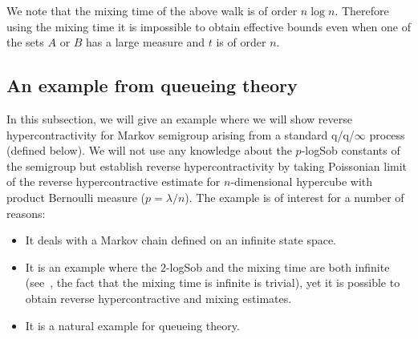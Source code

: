 \documentclass[11pt]{amsart}
\newcommand{\1}{\mathbf{1}}
\theoremstyle{definition}
\theoremstyle{plain}
\theoremstyle{remark}
\numberwithin{equation}{section}
\begin{document}
We note that the mixing time of the above walk is of order $n \log n$. Therefore using the mixing time it is impossible to obtain effective bounds even when one of the sets $A$ or $B$ has a large measure and
$t$ is of order $n$. 

\subsection{An example from queueing theory} \label{subsec:queue} 
In this subsection, we will give an example where we will show reverse hypercontractivity for Markov semigroup arising from a standard q/q/$\infty$ process (defined below).  We will not use  any knowledge about the $p$-logSob constants of the semigroup but establish reverse hypercontractivity by taking Poissonian limit of the reverse hypercontractive estimate for $n$-dimensional hypercube with product Bernoulli measure ($p = \lambda/n$).  The example is of interest for a number of reasons:
\begin{itemize}
\item
It deals with a Markov chain defined on an infinite state space.
\item
It is an example where the $2$-logSob and the mixing time are both infinite (see~\cite{BobLedoux98}, the fact that the mixing time is infinite is trivial), yet it is possible to obtain
reverse hypercontractive and mixing estimates.
\item
It is a natural example for queueing theory.
\end{itemize}
\end{document}
